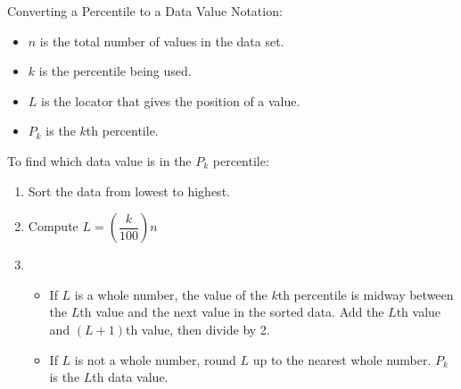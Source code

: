 \documentclass{beamer}
\begin{document}
\begin{frame}
\begin{block}{Converting a Percentile to a Data Value}
Notation:
\begin{itemize}
\item $n$ is the total number of values in the data set.
\item $k$ is the percentile being used.
\item $L$ is the locator that gives the position of a value.
\item $P_k$ is the $k$th percentile.
\end{itemize}\pause
To find which data value is in the $P_k$ percentile:
\begin{enumerate}
\item Sort the data from lowest to highest.\pause
\item Compute $L=\left(\dfrac{k}{100}\right)n$\pause
\item \begin{itemize}
\item If $L$ is a whole number, the value of the $k$th percentile is midway between the $L$th value and the next value in the sorted data. Add the $L$th value and $(L+1)$th value, then divide by 2.\pause
\item If $L$ is not a whole number, round $L$ up to the nearest whole number. $P_k$is the $L$th data value. 
\end{itemize}
\end{enumerate}
\end{block}
\end{frame}
\end{document}
